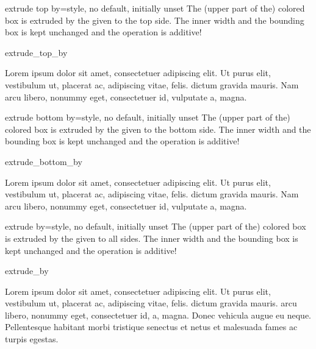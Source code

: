 \clearpage
\begin{docTcbKey}{extrude top by}{=}{style, no default, initially unset}
  The (upper part of the) colored box is extruded by the given  to the top side.
  The inner width and the bounding box is kept unchanged and the operation
  is additive!
\begin{exdispExample}{extrude_top_by}

Lorem ipsum dolor sit amet, consectetuer adipiscing elit. Ut purus elit,
vestibulum ut, placerat ac, adipiscing vitae, felis.
 dictum gravida mauris.
Nam arcu libero, nonummy eget, consectetuer id, vulputate a, magna.
\end{exdispExample}
\end{docTcbKey}

\begin{docTcbKey}{extrude bottom by}{=}{style, no default, initially unset}
  The (upper part of the) colored box is extruded by the given  to the bottom side.
  The inner width and the bounding box is kept unchanged and the operation
  is additive!
\begin{exdispExample}[safety=1cm]{extrude_bottom_by}

Lorem ipsum dolor sit amet, consectetuer adipiscing elit. Ut purus elit,
vestibulum ut, placerat ac, adipiscing vitae, felis.
 dictum gravida mauris.
Nam arcu libero, nonummy eget, consectetuer id, vulputate a, magna.
\end{exdispExample}
\end{docTcbKey}

\begin{docTcbKey}{extrude by}{=}{style, no default, initially unset}
  The (upper part of the) colored box is extruded by the given  to all sides.
  The inner width and the bounding box is kept unchanged and the operation
  is additive!
\begin{exdispExample}{extrude_by}

Lorem ipsum dolor sit amet, consectetuer adipiscing elit. Ut purus elit,
vestibulum ut, placerat ac, adipiscing vitae, felis.  dictum
gravida mauris. 
arcu libero, nonummy eget, consectetuer id,  a, magna. Donec
vehicula augue eu neque. Pellentesque habitant morbi tristique senectus et netus
et malesuada fames ac turpis egestas. 
\end{exdispExample}
\end{docTcbKey}

